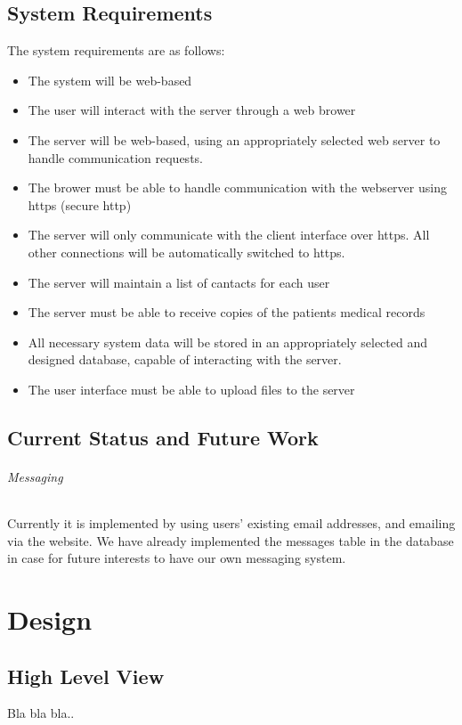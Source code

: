 \documentclass[12pt]{report}
\begin{document}
\chapter{System Requirements}
The system requirements are as follows:
\begin{itemize}
\item The system will be web-based
\item The user will interact with the server through a web brower
\item The server will be web-based, using an appropriately selected web server to handle communication requests.
\item The brower must be able to handle communication with the webserver using https (secure http)
\item The server will only communicate with the client interface over https.  All other connections will be automatically switched to https.
\item The server will maintain a list of cantacts for each user
\item The server must be able to receive copies of the patients medical records
\item All necessary system data will be stored in an appropriately selected and designed database, capable of interacting with the server.
\item The user interface must be able to upload files to the server
\end{itemize}

\chapter{Current Status and Future Work}
\paragraph{Messaging} Currently it is implemented by using users' existing email addresses, and emailing via the website. We have already implemented the messages table in the database in case for future interests to have our own messaging system.

\part{Design}

\chapter{High Level View}
Bla bla bla..
\end{document}
